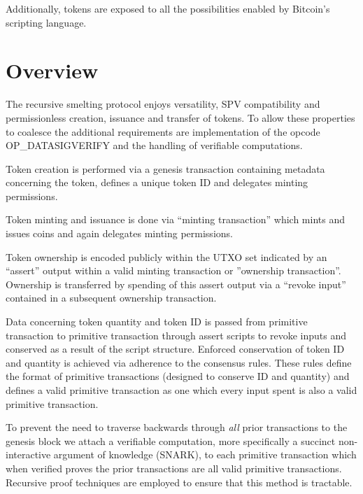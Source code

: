 \documentclass[9pt,oneside]{amsart}
\begin{document}
Additionally, tokens are exposed to all the possibilities enabled by Bitcoin's scripting language.

\section{Overview}
The recursive smelting protocol enjoys versatility, SPV compatibility and permissionless creation, issuance and transfer of tokens. To allow these properties to coalesce the additional requirements are implementation of the opcode OP\_DATASIGVERIFY and the handling of verifiable computations.

Token creation is performed via a genesis transaction containing metadata concerning the token, defines a unique token ID and delegates minting permissions.

Token minting and issuance is done via ``minting transaction'' which mints and issues coins and again delegates minting permissions.

Token ownership is encoded publicly within the UTXO set indicated by an ``assert'' output within a valid minting transaction or ''ownership transaction''. Ownership is transferred by spending of this assert output via a ``revoke input'' contained in a subsequent ownership transaction. 

Data concerning token quantity and token ID is passed from primitive transaction to primitive transaction through assert scripts to revoke inputs and conserved as a result of the script structure. Enforced conservation of token ID and quantity is achieved via adherence to the consensus rules. These rules define the format of primitive transactions (designed to conserve ID and quantity) and defines a valid primitive transaction as one which every input spent is also a valid primitive transaction.

To prevent the need to traverse backwards through \emph{all} prior transactions to the genesis block we attach a verifiable computation, more specifically a succinct non-interactive argument of knowledge (SNARK), to each primitive transaction which when verified proves the prior transactions are all valid primitive transactions. Recursive proof techniques are employed to ensure that this method is tractable. 
\end{document}
